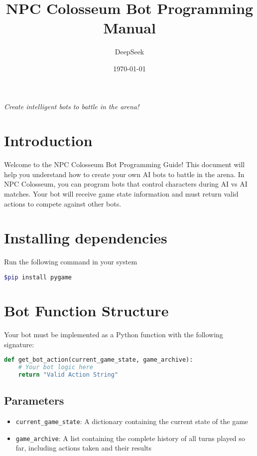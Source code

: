 \documentclass[12pt]{article}
\title{\Huge\textbf{NPC Colosseum Bot Programming Manual}}
\author{DeepSeek}
\date{\today}
\begin{document}
\maketitle

\begin{center}
\textit{Create intelligent bots to battle in the arena!}
\end{center}

\vspace{2em}

\tableofcontents
\newpage

\section{Introduction}
\label{sec:introduction}

Welcome to the NPC Colosseum Bot Programming Guide! This document will help you understand how to create your own AI bots to battle in the arena. In NPC Colosseum, you can program bots that control characters during AI vs AI matches. Your bot will receive game state information and must return valid actions to compete against other bots.


\section{Installing dependencies}
Run the following command in your system
\begin{lstlisting}[language=bash]
$pip install pygame
\end{lstlisting}

\section{Bot Function Structure}
\label{sec:bot-structure}

Your bot must be implemented as a Python function with the following signature:

\begin{lstlisting}[language=Python, caption=Bot Function Signature]
def get_bot_action(current_game_state, game_archive):
    # Your bot logic here
    return "Valid Action String"
\end{lstlisting}

\subsection{Parameters}
\begin{itemize}
    \item \texttt{current\_game\_state}: A dictionary containing the current state of the game
    \item \texttt{game\_archive}: A list containing the complete history of all turns played so far, including actions taken and their results
\end{itemize}
\end{document}
